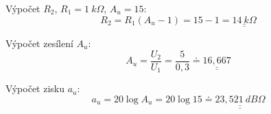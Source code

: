   Výpočet $R_2$, $R_1 = 1~k\Omega$, $A_u = 15$:
  \begin{equation}
  	R_2 = R_1(A_u - 1) = 15 - 1 = \underline{\underline{14~k\Omega}}
    \nonumber
  \end{equation}
  
  Výpočet zesílení $A_u$:
  \begin{equation}
  	A_u = \dfrac{U_2}{U_1} = \dfrac{5}{0,3} \doteq \underline{\underline{16,667}}
    \nonumber
  \end{equation}
    
  Výpočet zisku $a_u$:
  \begin{equation}
  	a_u = 20\log A_u = 20\log 15 \doteq \underline{\underline{23,521~dB\Omega}}
    \nonumber
  \end{equation}
  
  
 
